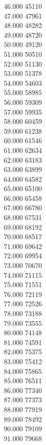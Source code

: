 { 46.000	45110 \\
 47.000	47961 \\
 48.000	48282 \\
 49.000	48720 \\
 50.000	49120 \\
 51.000	50510 \\
 52.000	51130 \\
 53.000	51378 \\
 54.000	54603 \\
 55.000	58985 \\
 56.000	59309 \\
 57.000	59935 \\
 58.000	60459 \\
 59.000	61238 \\
 60.000	61546 \\
 61.000	62634 \\
 62.000	63183 \\
 63.000	63899 \\
 64.000	64582 \\
 65.000	65100 \\
 66.000	65458 \\
 67.000	66780 \\
 68.000	67531 \\
 69.000	68192 \\
 70.000	68517 \\
 71.000	69642 \\
 72.000	69954 \\
 73.000	70670 \\
 74.000	71115 \\
 75.000	71551 \\
 76.000	72119 \\
 77.000	72526 \\
 78.000	73188 \\
 79.000	73555 \\
 80.000	74148 \\
 81.000	74591 \\
 82.000	75375 \\
 83.000	75412 \\
 84.000	75865 \\
 85.000	76511 \\
 86.000	77340 \\
 87.000	77373 \\
 88.000	77919 \\
 89.000	78492 \\
 90.000	79109 \\
 91.000	79668 \\
}
